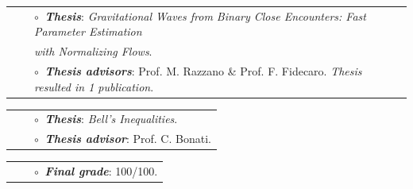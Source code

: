 \vspace{0.2cm}
\vspace{-0.1cm}
\begin{tabular}{rcl}
&\hspace{0.4cm} &$\circ\;\;${\textbf{\textit{Thesis}}}: \textit{Gravitational Waves from Binary Close Encounters: Fast Parameter Estimation} \\&\hspace{0.4cm} & 
\hspace{0.4cm}
\textit{\phantom{Thesis } with Normalizing Flows}.\\
&\hspace{0.4cm} &$\circ\;\;${\textbf{\textit{Thesis advisors}}}: Prof. M. Razzano \& Prof. F. Fidecaro. \textit{Thesis resulted in 1 publication}.\\

\end{tabular}

\vspace{0.2cm}
\vspace{-0.1cm}
\begin{tabular}{rcl}
&\hspace{0.4cm} &$\circ\;\;${\textbf{\textit{Thesis}}}: \textit{Bell's Inequalities}.\\
&\hspace{0.4cm} &$\circ\;\;${\textbf{\textit{Thesis advisor}}}:  Prof. C. Bonati.\\
\end{tabular}


\vspace{0.2cm}
\vspace{-0.1cm}
\begin{tabular}{rcl}
&\hspace{0.4cm} &$\circ\;\;${\textbf{\textit{Final grade}}}:  100/100.\\
\end{tabular}

